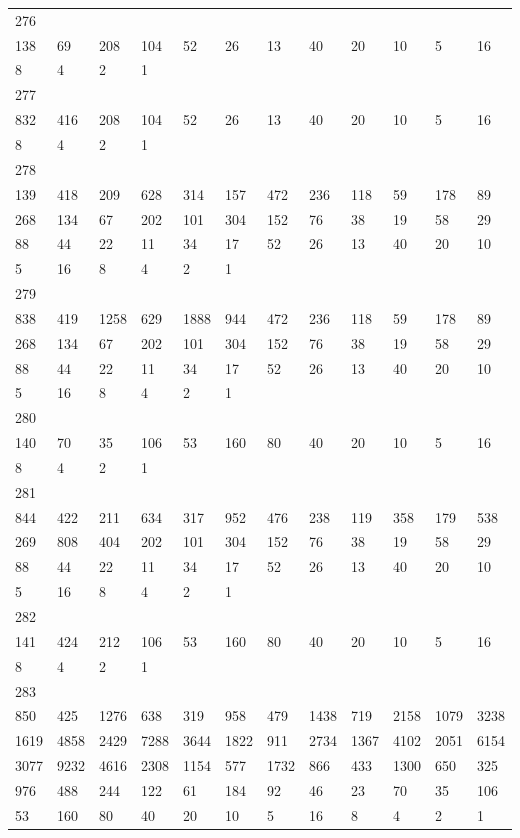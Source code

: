 \begin{longtable}{llllllllllll}
276&&&&&&&&&&&\\
138& 69& 208& 104& 52& 26& 13& 40& 20& 10& 5& 16\\
8& 4& 2& 1& \\

277&&&&&&&&&&&\\
832& 416& 208& 104& 52& 26& 13& 40& 20& 10& 5& 16\\
8& 4& 2& 1& \\

278&&&&&&&&&&&\\
139& 418& 209& 628& 314& 157& 472& 236& 118& 59& 178& 89\\
268& 134& 67& 202& 101& 304& 152& 76& 38& 19& 58& 29\\
88& 44& 22& 11& 34& 17& 52& 26& 13& 40& 20& 10\\
5& 16& 8& 4& 2& 1& \\

279&&&&&&&&&&&\\
838& 419& 1258& 629& 1888& 944& 472& 236& 118& 59& 178& 89\\
268& 134& 67& 202& 101& 304& 152& 76& 38& 19& 58& 29\\
88& 44& 22& 11& 34& 17& 52& 26& 13& 40& 20& 10\\
5& 16& 8& 4& 2& 1& \\

280&&&&&&&&&&&\\
140& 70& 35& 106& 53& 160& 80& 40& 20& 10& 5& 16\\
8& 4& 2& 1& \\

281&&&&&&&&&&&\\
844& 422& 211& 634& 317& 952& 476& 238& 119& 358& 179& 538\\
269& 808& 404& 202& 101& 304& 152& 76& 38& 19& 58& 29\\
88& 44& 22& 11& 34& 17& 52& 26& 13& 40& 20& 10\\
5& 16& 8& 4& 2& 1& \\

282&&&&&&&&&&&\\
141& 424& 212& 106& 53& 160& 80& 40& 20& 10& 5& 16\\
8& 4& 2& 1& \\

283&&&&&&&&&&&\\
850& 425& 1276& 638& 319& 958& 479& 1438& 719& 2158& 1079& 3238\\
1619& 4858& 2429& 7288& 3644& 1822& 911& 2734& 1367& 4102& 2051& 6154\\
3077& 9232& 4616& 2308& 1154& 577& 1732& 866& 433& 1300& 650& 325\\
976& 488& 244& 122& 61& 184& 92& 46& 23& 70& 35& 106\\
53& 160& 80& 40& 20& 10& 5& 16& 8& 4& 2& 1\\


\end{longtable}
